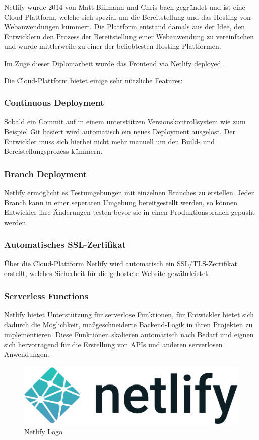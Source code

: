 
Netlify wurde 2014 von Matt Biilmann und Chris bach gegründet und ist eine Cloud-Plattform, welche sich spezial um die Bereitstellung und das Hosting von Webanwendungen kümmert. Die Plattform entstand damals aus der Idee, den Entwicklern den Prozess der Bereitstellung einer Webanwendung zu vereinfachen und wurde mittlerweile zu einer der beliebtesten Hosting Plattformen.
\cite{Netlify}

Im Zuge dieser Diplomarbeit wurde das Frontend via Netlify deployed.

Die Cloud-Plattform bietet einige sehr nützliche Features:

\subsubsection{Continuous Deployment}
Sobald ein Commit auf in einem unterstützen Versionskontrollsystem wie zum Beispiel Git basiert wird automatisch ein neues Deployment ausgelöst. Der Entwickler muss sich hierbei nicht mehr manuell um den Build- und Bereistellungsprozess kümmern.

\subsubsection{Branch Deployment}
Netlify ermöglicht es Testumgebungen mit einzelnen Branches zu erstellen. Jeder Branch kann in einer seperaten Umgebung bereitgestellt werden, so können Entwickler ihre Änderungen testen bevor sie in einen Produktionsbranch gepusht werden.

\subsubsection{Automatisches SSL-Zertifikat}
Über die Cloud-Plattform Netlify wird automatisch ein SSL/TLS-Zertifikat erstellt, welches Sicherheit für die gehostete Website gewährleistet.

\subsubsection{Serverless Functions}
Netlify bietet Unterstützung für serverlose Funktionen, für Entwickler bietet sich dadurch die Möglichkeit, maßgeschneiderte Backend-Logik in ihren Projekten zu implementieren. Diese Funktionen skalieren automatisch nach Bedarf und eignen sich hervorragend für die Erstellung von APIs und anderen serverlosen Anwendungen.

\begin{figure}[h!]
    \centering
    \includegraphics[width=0.5\linewidth]{pics/netlify-logo.png}
    \caption{Netlify Logo}
    \label{fig:enter-label}
\end{figure}

\cite{Was_ist_Netlify}
